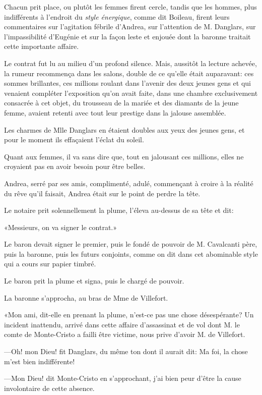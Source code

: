 Chacun prit place, ou plutôt les femmes firent cercle, tandis que les hommes, plus indifférents à l'endroit du \textit{style énergique}, comme dit Boileau, firent leurs commentaires sur l'agitation fébrile d'Andrea, sur l'attention de M. Danglars, sur l'impassibilité d'Eugénie et sur la façon leste et enjouée dont la baronne traitait cette importante affaire. 

Le contrat fut lu au milieu d'un profond silence. Mais, aussitôt la lecture achevée, la rumeur recommença dans les salons, double de ce qu'elle était auparavant: ces sommes brillantes, ces millions roulant dans l'avenir des deux jeunes gens et qui venaient compléter l'exposition qu'on avait faite, dans une chambre exclusivement consacrée à cet objet, du trousseau de la mariée et des diamants de la jeune femme, avaient retenti avec tout leur prestige dans la jalouse assemblée. 

Les charmes de Mlle Danglars en étaient doubles aux yeux des jeunes gens, et pour le moment ils effaçaient l'éclat du soleil. 

Quant aux femmes, il va sans dire que, tout en jalousant ces millions, elles ne croyaient pas en avoir besoin pour être belles. 

Andrea, serré par ses amis, complimenté, adulé, commençant à croire à la réalité du rêve qu'il faisait, Andrea était sur le point de perdre la tête. 

Le notaire prit solennellement la plume, l'éleva au-dessus de sa tête et dit: 

«Messieurs, on va signer le contrat.» 

Le baron devait signer le premier, puis le fondé de pouvoir de M. Cavalcanti père, puis la baronne, puis les futurs conjoints, comme on dit dans cet abominable style qui a cours sur papier timbré. 

Le baron prit la plume et signa, puis le chargé de pouvoir. 

La baronne s'approcha, au bras de Mme de Villefort. 

«Mon ami, dit-elle en prenant la plume, n'est-ce pas une chose désespérante? Un incident inattendu, arrivé dans cette affaire d'assassinat et de vol dont M. le comte de Monte-Cristo a failli être victime, nous prive d'avoir M. de Villefort. 

—Oh! mon Dieu! fit Danglars, du même ton dont il aurait dit: Ma foi, la chose m'est bien indifférente! 

—Mon Dieu! dit Monte-Cristo en s'approchant, j'ai bien peur d'être la cause involontaire de cette absence. 

